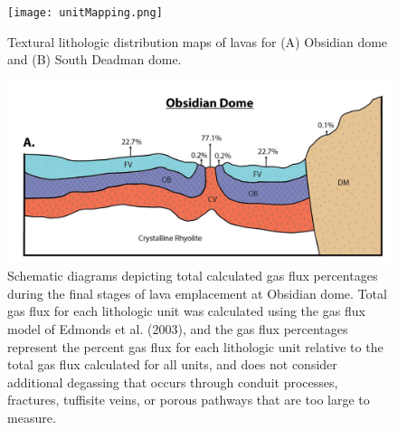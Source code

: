 \documentclass[11pt]{article}
\begin{document}
\begin{figure}
   \centering
\texttt{[image: unitMapping.png]}
\caption{Textural lithologic distribution maps of lavas for (A) Obsidian dome and (B) South Deadman dome.}
\label{fig:unitMapping}
\end{figure}

\begin{figure}
   \centering
\includegraphics[scale=0.5]{crossSection.png}
\caption{Schematic diagrams depicting total calculated gas flux percentages during the final stages of lava emplacement at Obsidian dome. Total gas flux for each lithologic unit was calculated using the gas flux model of Edmonds et al. (2003), and the gas flux percentages represent the percent gas flux for each lithologic unit relative to the total gas flux calculated for all units, and does not consider additional degassing that occurs through conduit processes, fractures, tuffisite veins, or porous pathways that are too large to measure.}
\label{fig:crossSection}
\end{figure}
\end{document}
